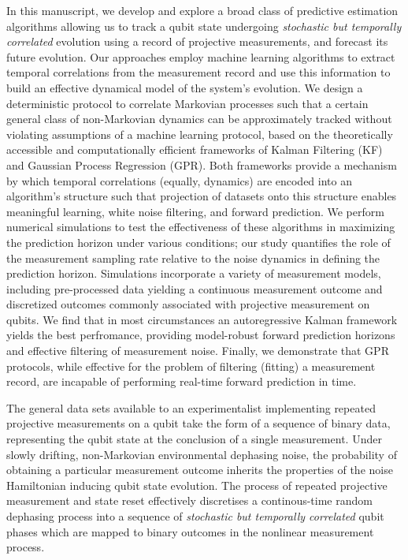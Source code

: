 In this manuscript, we develop and explore a broad class of predictive estimation algorithms allowing us to track a qubit state undergoing \emph{stochastic but temporally correlated} evolution using a record of projective measurements, and forecast its future evolution. Our approaches employ machine learning algorithms to extract temporal correlations from the measurement record and use this information to build an effective dynamical model of the system's evolution.  We design a deterministic protocol to correlate Markovian processes such that a certain general class of non-Markovian dynamics can be approximately tracked without violating assumptions of a machine learning protocol, based on the theoretically accessible and computationally efficient frameworks of Kalman Filtering (KF) and Gaussian Process Regression (GPR).  Both frameworks provide a mechanism by which temporal correlations (equally, dynamics) are encoded into an algorithm's structure such that projection of datasets onto this structure enables meaningful learning, white noise filtering, and forward prediction.  We perform numerical simulations to test the effectiveness of these algorithms in maximizing the prediction horizon under various conditions; our study quantifies the role of the measurement sampling rate relative to the noise dynamics in defining the prediction horizon.  Simulations incorporate a variety of measurement models, including pre-processed data yielding a continuous measurement outcome and discretized outcomes commonly associated with projective measurement on qubits.   We find that in most circumstances an autoregressive Kalman framework yields the best perfromance, providing model-robust forward prediction horizons and effective filtering of measurement noise.  Finally, we demonstrate that GPR protocols, while effective for the problem of filtering (fitting) a measurement record, are incapable of performing real-time forward prediction in time.  

The general data sets available to an experimentalist implementing repeated projective measurements on a qubit take the form of a sequence of binary data, representing the qubit state at the conclusion of a single measurement.  Under slowly drifting, non-Markovian environmental dephasing noise, the probability of obtaining a particular measurement outcome inherits the properties of the noise Hamiltonian inducing qubit state evolution. The process of repeated projective measurement and state reset effectively discretises a continous-time random dephasing process into a sequence of \textit{stochastic but temporally correlated} qubit phases which are mapped to binary outcomes in the nonlinear measurement process.

